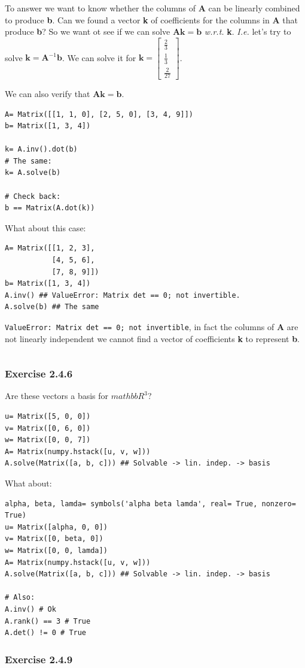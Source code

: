 To answer we want to know whether the columns of \textbf{A} can be linearly combined
to produce \textbf{b}. Can we found a vector \textbf{k} of coefficients for the
columns in \textbf{A} that produce \textbf{b}?
So we want ot see if we can solve $\mathbf{Ak} = \mathbf{b}$ \emph{w.r.t.} \textbf{k}.
\emph{I.e.} let's try to solve $\mathbf{k}= \mathbf{A}^{-1}\mathbf{b}$. We can solve it
for $\mathbf{k} = \left[\begin{matrix}\frac{2}{3}\\\frac{1}{3}\\\frac{2}{27}\end{matrix}\right]$.

We can also verify that $\mathbf{Ak} = \mathbf{b}$.

\begin{verbatim}
A= Matrix([[1, 1, 0], [2, 5, 0], [3, 4, 9]])
b= Matrix([1, 3, 4])

k= A.inv().dot(b)
# The same:
k= A.solve(b)

# Check back:
b == Matrix(A.dot(k))
\end{verbatim}

What about this case:

\begin{verbatim}
A= Matrix([[1, 2, 3],
           [4, 5, 6],
           [7, 8, 9]])
b= Matrix([1, 3, 4])
A.inv() ## ValueError: Matrix det == 0; not invertible.
A.solve(b) ## The same
\end{verbatim}

\texttt{ValueError: Matrix det == 0; not invertible}, in fact the columns of \textbf{A}
are not linearly independent we cannot find a vector of coefficients \textbf{k} 
to represent \textbf{b}.

\begin{verbatim}
\end{verbatim}

\subsubsection{Exercise 2.4.6}

Are these vectors a basis for $mathbb{R}^3$?

\begin{verbatim}
u= Matrix([5, 0, 0])
v= Matrix([0, 6, 0])
w= Matrix([0, 0, 7])
A= Matrix(numpy.hstack([u, v, w]))
A.solve(Matrix([a, b, c])) ## Solvable -> lin. indep. -> basis
\end{verbatim}

What about:

\begin{verbatim}
alpha, beta, lamda= symbols('alpha beta lamda', real= True, nonzero= True)
u= Matrix([alpha, 0, 0])
v= Matrix([0, beta, 0])
w= Matrix([0, 0, lamda])
A= Matrix(numpy.hstack([u, v, w]))
A.solve(Matrix([a, b, c])) ## Solvable -> lin. indep. -> basis

# Also:
A.inv() # Ok
A.rank() == 3 # True
A.det() != 0 # True
\end{verbatim}

\subsubsection{Exercise 2.4.9}

